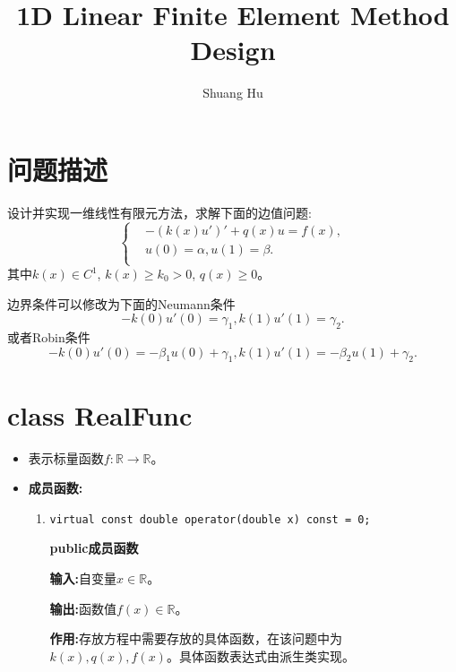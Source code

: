 \documentclass[UTF8]{ctexart}
\title{1D Linear Finite Element Method Design}
\author{Shuang Hu}
\theoremstyle{plain}
\theoremstyle{definition}
\theoremstyle{remark}
\begin{document}
\maketitle
\section{问题描述}
设计并实现一维线性有限元方法，求解下面的边值问题:
\begin{equation}
    \left\{
    \begin{aligned}
        &-(k(x)u')'+q(x)u=f(x),\\
        &u(0)=\alpha, u(1)=\beta.\\
    \end{aligned}
    \right.
\end{equation}
其中$k(x)\in C^{1}$, $k(x)\ge k_{0}>0$, $q(x)\ge 0$。

边界条件可以修改为下面的Neumann条件
\begin{equation}
    -k(0)u'(0)=\gamma_{1},k(1)u'(1)=\gamma_{2}.
\end{equation}
或者Robin条件
\begin{equation}
    -k(0)u'(0)=-\beta_{1}u(0)+\gamma_{1},k(1)u'(1)=-\beta_{2}u(1)+\gamma_{2}.
\end{equation}
\section{class RealFunc}
\begin{itemize}
    \item 表示标量函数$f:\mathbb{R}\rightarrow\mathbb{R}$。
    \item \textbf{成员函数:}
    \begin{enumerate}
        \item \texttt{virtual const double operator(double x) const = 0;}
        
        \textbf{public成员函数}

        \textbf{输入:}自变量$x\in\mathbb{R}$。

        \textbf{输出:}函数值$f(x)\in\mathbb{R}$。

        \textbf{作用:}存放方程中需要存放的具体函数，在该问题中为$k(x),q(x),f(x)$。具体函数表达式由派生类实现。
    \end{enumerate}
\end{itemize}
\end{document}
